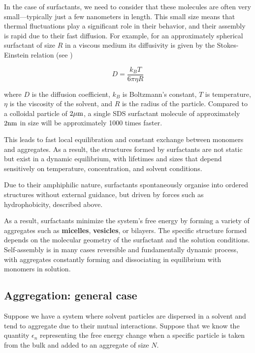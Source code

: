 \documentclass[
  letterpaper,
  enabledeprecatedfontcommands]{report}
\begin{document}
In the case of surfactants, we need to consider that these molecules are
often very small---typically just a few nanometers in length. This small
size means that thermal fluctuations play a significant role in their
behavior, and their assembly is rapid due to their fast diffusion. For
example, for an approximately spherical surfactant of size \(R\) in a
viscous medium its diffusivity is given by the Stokes-Einstein relation
(see )

\[
D = \frac{k_B T}{6\pi \eta R}
\]

where \(D\) is the diffusion coefficient, \(k_B\) is Boltzmann's
constant, \(T\) is temperature, \(\eta\) is the viscosity of the
solvent, and \(R\) is the radius of the particle. Compared to a
colloidal particle of \(2 {\rm \mu m}\), a single SDS surfactant
molecule of approximately \(2 {\rm nm}\) in size will be approximately
1000 times faster.

This leads to fast local equilibration and constant exchange between
monomers and aggregates. As a result, the structures formed by
surfactants are not static but exist in a dynamic equilibrium, with
lifetimes and sizes that depend sensitively on temperature,
concentration, and solvent conditions.

Due to their amphiphilic nature, surfactants spontaneously organise into
ordered structures without external guidance, but driven by forces such
as hydrophobicity, described above.

As a result, surfactants minimize the system's free energy by forming a
variety of aggregates such as \textbf{micelles}, \textbf{vesicles}, or
bilayers. The specific structure formed depends on the molecular
geometry of the surfactant and the solution conditions. Self-assembly is
in many cases reversible and fundamentally dynamic process, with
aggregates constantly forming and dissociating in equilibrium with
monomers in solution.

\subsection{Aggregation: general case}\label{aggregation-general-case}

Suppose we have a system where solvent particles are dispersed in a
solvent and tend to aggregate due to their mutual interactions. Suppose
that we know the quantity \(\epsilon_n\) representing the free energy
change when a specific particle is taken from the bulk and added to an
aggregate of size \(N\).
\end{document}
